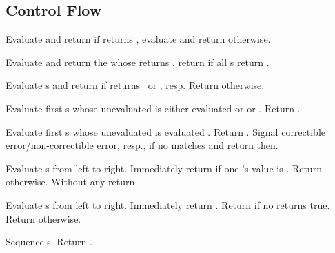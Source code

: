 \subsection{Control Flow}
\begin{LIST}{1cm}

   Evaluate and return
   if  returns \T, evaluate and return
   otherwise.

  Evaluate and return the
   whose  returns \T, return
  \retval{\NIL} if all s return \NIL.

  Evaluate s and return  if
   returns \T\ or \NIL, resp. Return \retval{\NIL} otherwise.

  Evaluate first s whose unevaluated  is either  evaluated
   or  or . Return .

  Evaluate first s whose unevaluated  is  evaluated
  . Return . Signal correctible error/non-correctible error,
  resp., if no  matches and return \retval{\NIL} then.

   Evaluate s from left to
  right. Immediately return \retval{\NIL} if one 's value is \NIL. Return
   otherwise. Without any 
  return \retval{\NIL}

   Evaluate s from left to
  right. Immediately return . Return \retval{\NIL} if no  returns true.
  Return  otherwise.

   Sequence s. Return
  .


\end{LIST}
